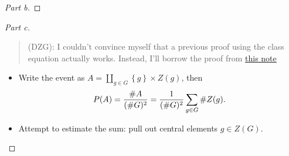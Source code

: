 \begin{solution}
\begin{proof}[Part b]
\end{proof}

\begin{proof}[Part c]

\envlist

\begin{quote}
(DZG): I couldn't convince myself that a previous proof using the class
equation actually works. Instead, I'll borrow the proof from
\href{https://math.berkeley.edu/~tb65536/Commuting_Probability.pdf}{this
note}
\end{quote}

\begin{itemize}
\tightlist
\item
  Write the event as
  \(A = \displaystyle\coprod_{g\in G} \left\{{g}\right\} \times Z(g)\),
  then
  \begin{align*}
  P(A) 
  = {\# A\over (\# G)^2} 
  = {1\over (\# G)^2} \sum_{g\in G} \# Z(g)
  .\end{align*}
\item
  Attempt to estimate the sum: pull out central elements \(g\in Z(G)\).


\end{itemize}
\end{proof}
\end{solution}
